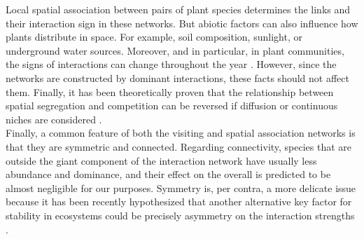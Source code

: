 Local spatial association between pairs of plant species determines the links and their interaction sign in these networks. But abiotic factors can also influence how plants distribute in space. For example, soil composition, sunlight, or underground water sources. Moreover, and in particular, in plant communities, the signs of interactions can change throughout the year \cite{losapio2019perspectives}. However, since the networks are constructed by dominant interactions, these facts should not affect them. Finally, it has been theoretically proven that the relationship between spatial segregation and competition can be reversed if diffusion or continuous niches are considered \cite{hernandez2009species}.  \\

Finally, a common feature of both the visiting and spatial association networks is that they are symmetric and connected. Regarding connectivity, species that are outside the giant component of the interaction network have usually less abundance and dominance, and their effect on the overall is predicted to be almost negligible for our purposes. Symmetry is, per contra, a more delicate issue because it has been recently hypothesized that another alternative key factor for stability in ecosystems could be precisely asymmetry on the interaction strengths \cite{allen2023structural}. 




